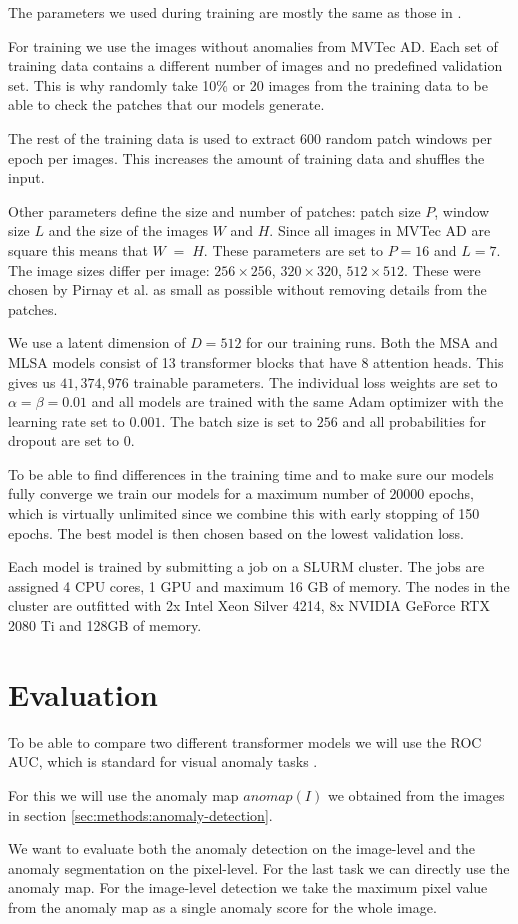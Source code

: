 The parameters we used during training are mostly the same as those in \cite{pirnay_inpainting_2021}.

For training we use the images without anomalies from MVTec AD. Each set of training data contains a different number of images and no predefined validation set. This is why randomly take 10\% or 20 images from the training data to be able to check the patches that our models generate.

The rest of the training data is used to extract 600 random patch windows per epoch per images. This increases the amount of training data and shuffles the input.

Other parameters define the size and number of patches: patch size $P$, window size $L$ and the size of the images $W$ and $H$. Since all images in MVTec AD are square this means that $W \;=\; H$. These parameters are set to $P = 16$ and $L = 7$. The image sizes differ per image: $256 \times 256$, $320 \times 320$, $512 \times 512$. These were chosen by Pirnay et al. as small as possible without removing details from the patches.

We use a latent dimension of $D = 512$ for our training runs. Both the MSA and MLSA models consist of 13 transformer blocks that have 8 attention heads. This gives us $41,374,976$ trainable parameters. The individual loss weights are set to $\alpha = \beta = 0.01$ and all models are trained with the same Adam optimizer with the learning rate set to $0.001$. The batch size is set to $256$ and all probabilities for dropout are set to $0$.

To be able to find differences in the training time and to make sure our models fully converge we train our models for a maximum number of $20000$ epochs, which is virtually unlimited since we combine this with early stopping of 150 epochs. The best model is then chosen based on the lowest validation loss.

Each model is trained by submitting a job on a SLURM cluster. The jobs are assigned 4 CPU cores, 1 GPU and maximum 16 GB of memory. The nodes in the cluster are outfitted with 2x Intel Xeon Silver 4214, 8x NVIDIA GeForce RTX 2080 Ti and 128GB of memory.

\section{Evaluation}

To be able to compare two different transformer models we will use the ROC AUC, which is standard for visual anomaly tasks \cite{pirnay_inpainting_2021, zavrtanik_reconstruction_2021, schlegl_unsupervised_2017, li_cutpaste_2021, tsai_autoencoder-based_2021, xie_semisupervised_2021, bergmann_mvtec_2019}.

For this we will use the anomaly map $anomap(I)$ we obtained from the images in section \ref{sec:methods:anomaly-detection}.

We want to evaluate both the anomaly detection on the image-level and the anomaly segmentation on the pixel-level. For the last task we can directly use the anomaly map. For the image-level detection we take the maximum pixel value from the anomaly map as a single anomaly score for the whole image.